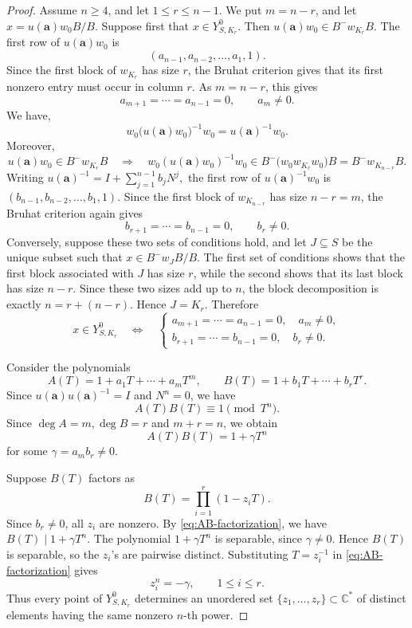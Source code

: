 \documentclass[12pt, reqno]{amsart}
\theoremstyle{plain}
\numberwithin{equation}{section}
\theoremstyle{definition}
\begin{document}
\begin{proof}
Assume \(n\ge4\), and let \(1\le r\le n-1\). We put \(m=n-r\), and let $x=u(\mathbf a)w_0B/B.$
Suppose first that \(x\in Y^0_{S,K_r}\). Then
\(u(\mathbf a)w_0 \in B^-w_{K_r}B\). The first row of \(u(\mathbf a)w_0\) is
\[
(a_{n-1},a_{n-2},\ldots,a_1,1).
\]
Since the first block of \(w_{K_r}\) has size \(r\), the Bruhat
criterion gives that its first
nonzero entry must occur in column \(r\). As \(m=n-r\), this gives
\[
a_{m+1}=\cdots=a_{n-1}=0,
\qquad
a_m\neq0.
\]
We have,
\[
w_0\bigl(u(\mathbf a)w_0\bigr)^{-1}w_0
=
u(\mathbf a)^{-1}w_0.
\]
Moreover,
\[
u(\mathbf a)w_0 \in B^-w_{K_r}B
\quad\Longrightarrow\quad
w_0(u(\mathbf a)w_0)^{-1}w_0
\in
B^-\bigl(w_0w_{K_r}w_0\bigr)B
=
B^-w_{K_{n-r}}B.
\]
Writing $u(\mathbf a)^{-1}
=
I+\sum_{j=1}^{n-1}b_jN^j,$ the first row of \(u(\mathbf a)^{-1}w_0\) is $(b_{n-1},b_{n-2},\ldots,b_1,1).$
Since the first block of \(w_{K_{n-r}}\) has size \(n-r=m\), the
Bruhat criterion again  gives
\[
b_{r+1}=\cdots=b_{n-1}=0,
\qquad
b_r\neq0.
\]
Conversely, suppose these two sets of conditions hold, and let
\(J\subseteq S\) be the unique subset such that
\(x\in B^-w_JB/B\). The first set of conditions shows that the first
block associated with \(J\) has size \(r\), while the second shows
that its last block has size \(n-r\). Since these two sizes add up to
\(n\), the block decomposition is exactly \(n=r+(n-r)\). Hence
\(J=K_r\). Therefore
\begin{equation}\label{eq:maximal-stratum-toeplitz}
x\in Y^0_{S,K_r}
\quad\Longleftrightarrow\quad
\begin{cases}
a_{m+1}=\cdots=a_{n-1}=0,\quad a_m\neq0,\\
b_{r+1}=\cdots=b_{n-1}=0,\quad b_r\neq0.
\end{cases}
\end{equation}

Consider the polynomials
\[
A(T)=1+a_1T+\cdots+a_mT^m,
\qquad
B(T)=1+b_1T+\cdots+b_rT^r.
\]
Since $u(\mathbf a)u(\mathbf a)^{-1}=I$
and \(N^n=0\), we have 
\[
A(T)B(T)\equiv1\pmod{T^n}.
\]
Since $\deg A=m,\deg B=r$ and $ m+r=n$, 
we obtain
\begin{equation}\label{eq:AB-factorization}
A(T)B(T)=1+\gamma T^n
\end{equation}
for some $\gamma=a_mb_r\neq0.$

Suppose $B(T)$ factors as
\[
B(T)=\prod_{i=1}^r(1-z_iT).
\]
Since \(b_r\neq0\), all \(z_i\) are nonzero. By
\eqref{eq:AB-factorization}, we have $B(T)\mid 1+\gamma T^n.$
The polynomial \(1+\gamma T^n\) is separable, since
\(\gamma\neq0\). Hence \(B(T)\) is separable, so the \(z_i\)'s are
pairwise distinct. Substituting \(T=z_i^{-1}\) in
\eqref{eq:AB-factorization} gives
\[
z_i^n=-\gamma,
\qquad
1\le i\le r.
\]
Thus every point of \(Y^0_{S,K_r}\) determines an unordered set $\{z_1,\ldots,z_r\}
\subset\mathbb C^*$
of distinct elements having the same nonzero \(n\)-th power.


\end{proof}
\end{document}
